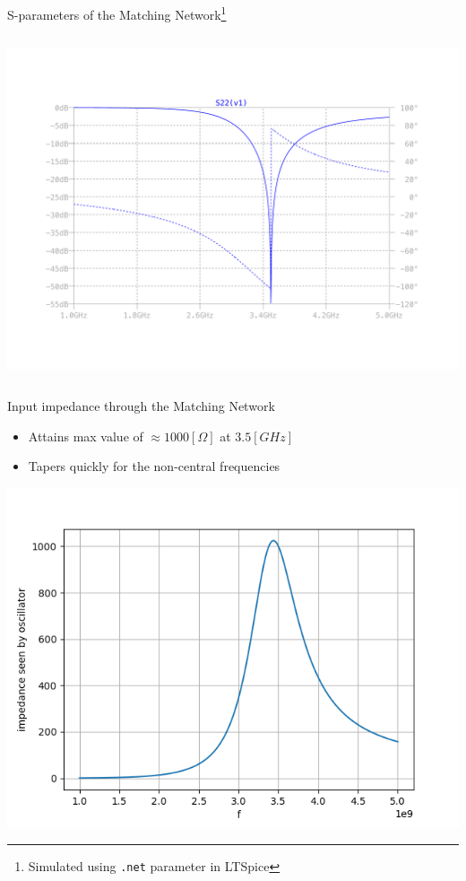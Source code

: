 \documentclass{beamer}
\begin{document}
\begin{frame}{S-parameters of the Matching Network\footnote{Simulated using \lstinline|.net| parameter in LTSpice}}
\begin{columns}
  \includegraphics[width=\linewidth]{images/matching_s_params/S22.pdf}
\end{columns}
\end{frame}

\begin{frame}{Input impedance through the Matching Network}
  \begin{itemize}
    \item Attains max value of \(\approx 1000[\Omega]\) at \(3.5[GHz]\)
    \item Tapers quickly for the non-central frequencies
  \end{itemize}
  \begin{center}
    \includegraphics[width=0.6\linewidth]{images/matching_s_params/matching_input_imp.png}
  \end{center}
\end{frame}
\end{document}
